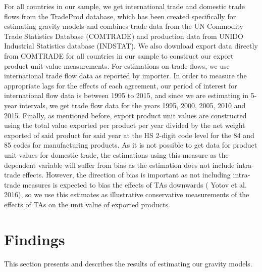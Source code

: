 \documentclass[12pt]{article}%
\begin{document}
For all countries in our sample, we get international trade and domestic
trade flows from the TradeProd database, which has been created
specifically for estimating gravity models and combines trade data from
the UN Commodity Trade Statistics Database (COMTRADE) and production
data from UNIDO Industrial Statistics database (INDSTAT). We also
download export data directly from COMTRADE for all countries in our
sample to construct our export product unit value measurements. For
estimations on trade flows, we use international trade flow data as
reported by importer. In order to measure the appropriate lags for the
effects of each agreement, our period of interest for international flow
data is between 1995 to 2015, and since we are estimating in 5-year
intervals, we get trade flow data for the years 1995, 2000, 2005, 2010
and 2015. Finally, as mentioned before, export product unit values are
constructed using the total value exported per product per year divided
by the net weight exported of said product for said year at the HS
2-digit code level for the 84 and 85 codes for manufacturing products.
As it is not possible to get data for product unit values for domestic
trade, the estimations using this measure as the dependent variable will
suffer from bias as the estimation does not include intra-trade effects.
However, the direction of bias is important as not including intra-trade
measures is expected to bias the effects of TAs downwards (\cite{yotov_advanced_2016} Yotov et al.
2016), so we use this estimates as illustrative conservative
measurements of the effects of TAs on the unit value of exported
products.

%
\section{Findings}%
\label{sec:Findings}%
This section presents and describes the results of estimating our gravity models.

%
\end{document}
